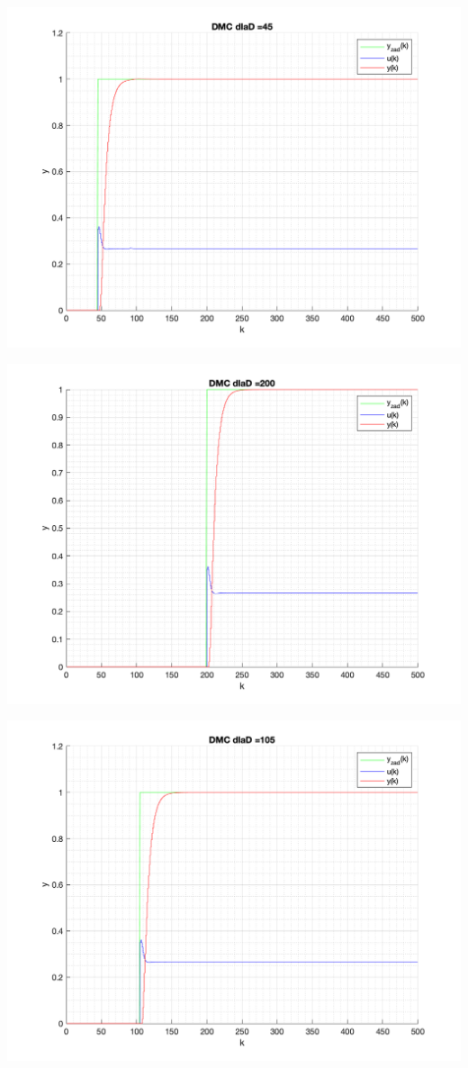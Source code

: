 \documentclass[a4paper, 11pt]{article}
\begin{document}
\begin{enumerate}
 \includegraphics[width=\linewidth]{./ModelsP4_D/P4_DMC_D_45_png.png} 
 
 \includegraphics[width=\linewidth]{./ModelsP4_D/P4_DMC_D_200_png.png} 
 
 \includegraphics[width=\linewidth]{./ModelsP4_D/P4_DMC_D_105_png.png} 
 

\end{enumerate}
\end{document}
